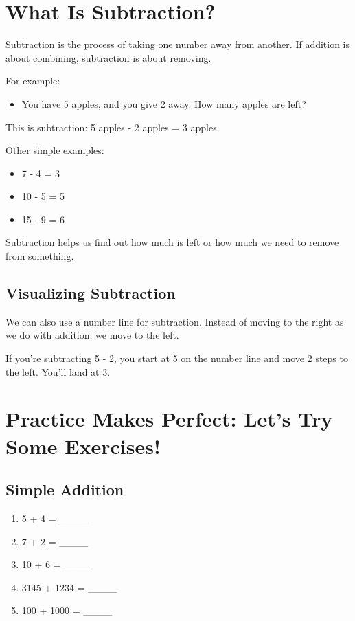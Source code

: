 \section{What Is Subtraction?}
Subtraction is the process of taking one number away from another. If addition is about combining, subtraction is about removing.

For example:
\begin{itemize}
    \item You have 5 apples, and you give 2 away. How many apples are left?
\end{itemize}
This is subtraction: 5 apples - 2 apples = 3 apples.

Other simple examples:
\begin{itemize}
    \item 7 - 4 = 3
    \item 10 - 5 = 5
    \item 15 - 9 = 6
\end{itemize}

Subtraction helps us find out how much is left or how much we need to remove from something.

\subsection{Visualizing Subtraction}
We can also use a number line for subtraction. Instead of moving to the right as we do with addition, we move to the left.

If you’re subtracting 5 - 2, you start at 5 on the number line and move 2 steps to the left. You’ll land at 3.

\section{Practice Makes Perfect: Let’s Try Some Exercises!}
\subsection{Simple Addition}
\begin{enumerate}
    \item 5 + 4 = \_\_\_\_
    \item 7 + 2 = \_\_\_\_
    \item 10 + 6 = \_\_\_\_
    \item 3145 + 1234 = \_\_\_\_
    \item 100 + 1000 = \_\_\_\_
\end{enumerate}

